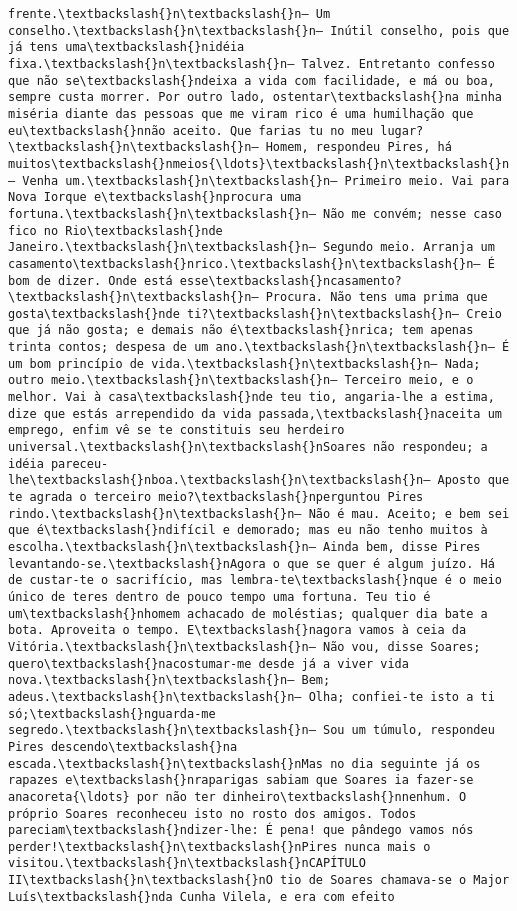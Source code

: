 \begin{Verbatim}[commandchars=\\\{\}]
frente.\textbackslash{}n\textbackslash{}n— Um conselho.\textbackslash{}n\textbackslash{}n— Inútil conselho, pois que já tens uma\textbackslash{}nidéia fixa.\textbackslash{}n\textbackslash{}n— Talvez. Entretanto confesso que não se\textbackslash{}ndeixa a vida com facilidade, e má ou boa, sempre custa morrer. Por outro lado, ostentar\textbackslash{}na minha miséria diante das pessoas que me viram rico é uma humilhação que eu\textbackslash{}nnão aceito. Que farias tu no meu lugar?\textbackslash{}n\textbackslash{}n— Homem, respondeu Pires, há muitos\textbackslash{}nmeios{\ldots}\textbackslash{}n\textbackslash{}n— Venha um.\textbackslash{}n\textbackslash{}n— Primeiro meio. Vai para Nova Iorque e\textbackslash{}nprocura uma fortuna.\textbackslash{}n\textbackslash{}n— Não me convém; nesse caso fico no Rio\textbackslash{}nde Janeiro.\textbackslash{}n\textbackslash{}n— Segundo meio. Arranja um casamento\textbackslash{}nrico.\textbackslash{}n\textbackslash{}n— É bom de dizer. Onde está esse\textbackslash{}ncasamento?\textbackslash{}n\textbackslash{}n— Procura. Não tens uma prima que gosta\textbackslash{}nde ti?\textbackslash{}n\textbackslash{}n— Creio que já não gosta; e demais não é\textbackslash{}nrica; tem apenas trinta contos; despesa de um ano.\textbackslash{}n\textbackslash{}n— É um bom princípio de vida.\textbackslash{}n\textbackslash{}n— Nada; outro meio.\textbackslash{}n\textbackslash{}n— Terceiro meio, e o melhor. Vai à casa\textbackslash{}nde teu tio, angaria-lhe a estima, dize que estás arrependido da vida passada,\textbackslash{}naceita um emprego, enfim vê se te constituis seu herdeiro universal.\textbackslash{}n\textbackslash{}nSoares não respondeu; a idéia pareceu-lhe\textbackslash{}nboa.\textbackslash{}n\textbackslash{}n— Aposto que te agrada o terceiro meio?\textbackslash{}nperguntou Pires rindo.\textbackslash{}n\textbackslash{}n— Não é mau. Aceito; e bem sei que é\textbackslash{}ndifícil e demorado; mas eu não tenho muitos à escolha.\textbackslash{}n\textbackslash{}n— Ainda bem, disse Pires levantando-se.\textbackslash{}nAgora o que se quer é algum juízo. Há de custar-te o sacrifício, mas lembra-te\textbackslash{}nque é o meio único de teres dentro de pouco tempo uma fortuna. Teu tio é um\textbackslash{}nhomem achacado de moléstias; qualquer dia bate a bota. Aproveita o tempo. E\textbackslash{}nagora vamos à ceia da Vitória.\textbackslash{}n\textbackslash{}n— Não vou, disse Soares; quero\textbackslash{}nacostumar-me desde já a viver vida nova.\textbackslash{}n\textbackslash{}n— Bem; adeus.\textbackslash{}n\textbackslash{}n— Olha; confiei-te isto a ti só;\textbackslash{}nguarda-me segredo.\textbackslash{}n\textbackslash{}n— Sou um túmulo, respondeu Pires descendo\textbackslash{}na escada.\textbackslash{}n\textbackslash{}nMas no dia seguinte já os rapazes e\textbackslash{}nraparigas sabiam que Soares ia fazer-se anacoreta{\ldots} por não ter dinheiro\textbackslash{}nnenhum. O próprio Soares reconheceu isto no rosto dos amigos. Todos pareciam\textbackslash{}ndizer-lhe: É pena! que pândego vamos nós perder!\textbackslash{}n\textbackslash{}nPires nunca mais o visitou.\textbackslash{}n\textbackslash{}nCAPÍTULO II\textbackslash{}n\textbackslash{}nO tio de Soares chamava-se o Major Luís\textbackslash{}nda Cunha Vilela, e era com efeito 
\end{Verbatim}
